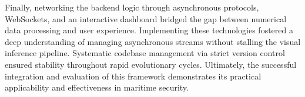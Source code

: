 Finally, networking the backend logic through asynchronous protocols, WebSockets, and an interactive dashboard bridged the gap between numerical data processing and user experience. Implementing these technologies fostered a deep understanding of managing asynchronous streams without stalling the visual inference pipeline. Systematic codebase management via strict version control ensured stability throughout rapid evolutionary cycles. Ultimately, the successful integration and evaluation of this framework demonstrates its practical applicability and effectiveness in maritime security.